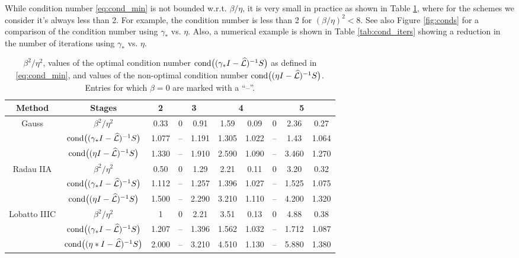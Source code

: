 \documentclass[a4paper,10pt]{article}
\begin{document}
While condition number \eqref{eq:cond_min} is not bounded w.r.t. $\beta/\eta$, it is very small in practice as shown in Table \ref{tab:cond}, where for the schemes we consider it's always less than 2. For example, the condition number is less than 2 for $(\beta/\eta)^2 < 8$. See also Figure \ref{fig:conds} for a comparison of the condition number using $\gamma_*$ vs. $\eta$. Also, a numerical example is shown in Table \ref{tab:cond_iters} showing a reduction in the number of iterations using $\gamma_*$ vs. $\eta$.
{
\renewcommand{\tabcolsep}{4pt}
\renewcommand{\arraystretch}{1.15}
\begin{table}[!ht]
  \centering
  \begin{tabular}{| c | c | c | cc | cc | ccc |}  %
  \hline
Method & Stages & 2 & \multicolumn{2}{c}{3} & \multicolumn{2}{|c}{4} & \multicolumn{3}{|c|}{5} \\\hline\hline
\multirow{ 3}{*}{Gauss}
&$\beta^2/\eta^2$ & 0.33 & 0 & 0.91 & 1.59 & 0.09 & 0 & 2.36 & 0.27 \\
&$\textnormal{cond}\big((\gamma_* I- \widehat{\mathcal{L}})^{-1}S\big)$ & 1.077 & -- & 1.191 & 1.305 & 1.022 & -- & 1.43 & 1.064\\
&$\textnormal{cond}\big((\eta I- \widehat{\mathcal{L}})^{-1}S\big)$ & 1.330 & -- & 1.910 & 2.590 & 1.090 & -- & 3.460 & 1.270\\\hline
\multirow{ 3}{*}{Radau IIA}
&$\beta^2/\eta^2$ & 0.50 & 0 & 1.29 & 2.21 & 0.11 & 0 & 3.20 & 0.32	\\
&$\textnormal{cond}\big((\gamma_* I- \widehat{\mathcal{L}})^{-1}S\big)$ & 1.112 & -- & 1.257 & 1.396 & 1.027 & -- & 1.525 & 1.075\\
&$\textnormal{cond}\big((\eta I- \widehat{\mathcal{L}})^{-1}S\big)$ & 1.500 & -- & 2.290 & 3.210 & 1.110 & -- & 4.200 & 1.320\\\hline
\multirow{ 3}{*}{Lobatto IIIC}
&$\beta^2/\eta^2$ & 1 & 0 & 2.21 & 3.51 & 0.13 & 0 & 4.88 & 0.38 \\
&$\textnormal{cond}\big((\gamma_* I- \widehat{\mathcal{L}})^{-1}S\big)$ & 1.207 & -- & 1.396 & 1.562 & 1.032 & -- & 1.712 & 1.087\\
&$\textnormal{cond}\big((\eta* I- \widehat{\mathcal{L}})^{-1}S\big)$ & 2.000 & -- & 3.210 & 4.510 & 1.130 & -- & 5.880 & 1.380\\
  \hline
  \end{tabular}
  \caption{$\beta^2/\eta^2$, values of the optimal condition number $\textnormal{cond}\big((\gamma_* I- \widehat{\mathcal{L}})^{-1}S\big)$ as defined in \eqref{eq:cond_min}, and values of the non-optimal condition number $\textnormal{cond}\big((\eta I- \widehat{\mathcal{L}})^{-1}S\big)$. Entries for which $\beta =  0$ are marked with a ``--''.}\label{tab:cond}
\end{table}

}
\end{document}
